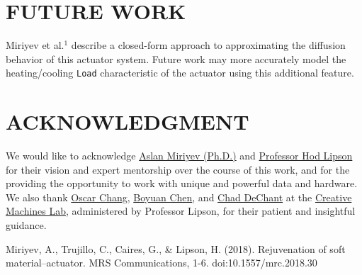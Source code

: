 \documentclass[letterpaper, 10 pt, conference]{ieeeconf}  %
\begin{document}
\section{FUTURE WORK}
Miriyev et al.$^1$ describe a closed-form approach to approximating the diffusion behavior of this actuator system. Future work may more accurately model the heating/cooling \verb|Load| characteristic of the actuator using this additional feature.

\section*{ACKNOWLEDGMENT}

We would like to acknowledge \href{http://aslanmiriyev.com/}{Aslan Miriyev (Ph.D.)} and \href{https://www.hodlipson.com/}{Professor Hod Lipson} for their vision and expert mentorship over the course of this work, and for the providing the opportunity to work with unique and powerful data and hardware. We also thank \href{http://ogchang.com/}{Oscar Chang}, \href{http://www.cs.columbia.edu/~bchen/}{Boyuan Chen}, and \href{http://www.cs.columbia.edu/~dechant/}{Chad DeChant} at the \href{https://www.creativemachineslab.com/}{Creative Machines Lab}, administered by Professor Lipson, for their patient and insightful guidance.

\begin{thebibliography}{99}

 Miriyev, A., Trujillo, C., Caires, G., & Lipson, H. (2018). Rejuvenation of soft material–actuator. MRS Communications, 1-6. doi:10.1557/mrc.2018.30

\end{thebibliography}
\end{document}
